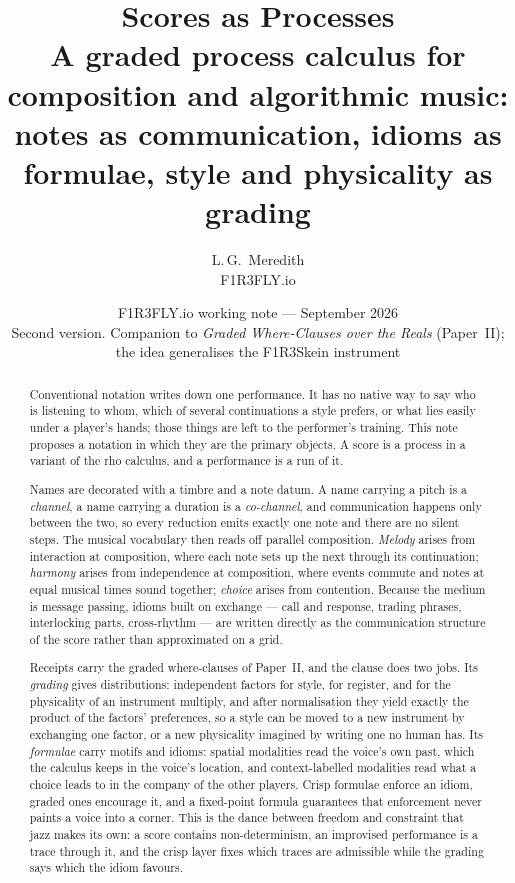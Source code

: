 \documentclass[11pt,a4paper]{article}
\title{\bfseries Scores as Processes\\[4pt]
\large A graded process calculus for composition and algorithmic music:\\
notes as communication, idioms as formulae, style and physicality as grading}
\author{L.\,G.\ Meredith\\ \small F1R3FLY.io}
\date{F1R3FLY.io working note --- September 2026\\[2pt]
\normalsize Second version. Companion to \emph{Graded Where-Clauses over the
Reals} (Paper~II); the idea generalises the F1R3Skein instrument}
\theoremstyle{plain}
\theoremstyle{definition}
\theoremstyle{remark}
\newcommand{\rhoc}{\textsf{rho}}
\begin{document}
\maketitle

\begin{abstract}
Conventional notation writes down one performance. It has no native way to say
who is listening to whom, which of several continuations a style prefers, or
what lies easily under a player's hands; those things are left to the
performer's training. This note proposes a notation in which they are the
primary objects. A score is a process in a variant of the \rhoc{} calculus, and
a performance is a run of it.

Names are decorated with a timbre and a note datum. A name carrying a pitch is a
\emph{channel}, a name carrying a duration is a \emph{co-channel}, and
communication happens only between the two, so every reduction emits exactly one
note and there are no silent steps. The musical vocabulary then reads off
parallel composition. \emph{Melody} arises from interaction at composition,
where each note sets up the next through its continuation; \emph{harmony} arises
from independence at composition, where events commute and notes at equal
musical times sound together; \emph{choice} arises from contention. Because the
medium is message passing, idioms built on exchange --- call and response,
trading phrases, interlocking parts, cross-rhythm --- are written directly as
the communication structure of the score rather than approximated on a grid.

Receipts carry the graded where-clauses of Paper~II, and the clause does two
jobs. Its \emph{grading} gives distributions: independent factors for style,
for register, and for the physicality of an instrument multiply, and after
normalisation they yield exactly the product of the factors' preferences, so a
style can be moved to a new instrument by exchanging one factor, or a new
physicality imagined by writing one no human has. Its \emph{formulae} carry
motifs and idioms: spatial modalities read the voice's own past, which the
calculus keeps in the voice's location, and context-labelled modalities read
what a choice leads to in the company of the other players. Crisp formulae
enforce an idiom, graded ones encourage it, and a fixed-point formula guarantees
that enforcement never paints a voice into a corner. This is the dance between freedom
and constraint that jazz makes its own: a score contains non-determinism, an
improvised performance is a trace through it, and the crisp layer fixes which
traces are admissible while the grading says which the idiom favours.


\end{abstract}
\end{document}
